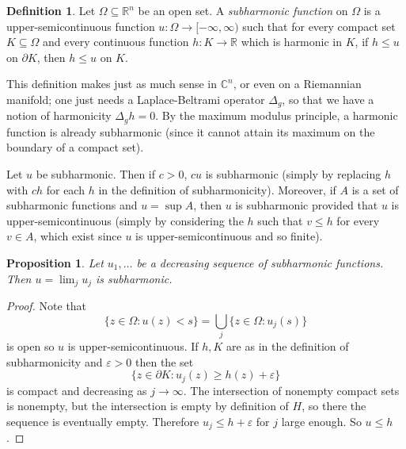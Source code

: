 \documentclass[12pt]{report}
\newcommand{\RR}{\mathbb{R}}
\newcommand{\CC}{\mathbb{C}}
\newcommand{\dfn}[1]{\emph{#1}\index{#1}}
\newtheorem{proposition}[theorem]{Proposition}
\theoremstyle{definition}
\newtheorem{definition}[theorem]{Definition}
\begin{document}
\begin{definition}
    Let $\Omega \subseteq \RR^n$ be an open set. A \dfn{subharmonic function} on $\Omega$ is a upper-semicontinuous function $u: \Omega \to [-\infty, \infty)$ such that for every compact set $K \subseteq \Omega$ and every continuous function $h: K \to \RR$ which is harmonic in $K$, if $h \leq u$ on $\partial K$, then $h \leq u$ on $K$.
\end{definition}
This definition makes just as much sense in $\CC^n$, or even on a Riemannian manifold; one just needs a Laplace-Beltrami operator $\Delta_g$, so that we have a notion of harmonicity $\Delta_g h = 0$. By the maximum modulus principle, a harmonic function is already subharmonic (since it cannot attain its maximum on the boundary of a compact set).

Let $u$ be subharmonic. Then if $c > 0$, $cu$ is subharmonic (simply by replacing $h$ with $ch$ for each $h$ in the definition of subharmonicity). Moreover, if $A$ is a set of subharmonic functions and $u = \sup A$, then $u$ is subharmonic provided that $u$ is upper-semicontinuous (simply by considering the $h$ such that $v \leq h$ for every $v \in A$, which exist since $u$ is upper-semicontinuous and so finite).

\begin{proposition}
Let $u_1, \dots$ be a decreasing sequence of subharmonic functions. Then $u = \lim_j u_j$ is subharmonic.
\end{proposition}
\begin{proof}
    Note that
    $$\{z \in \Omega: u(z) < s\} = \bigcup_j \{z \in \Omega: u_j(s)\}$$
    is open so $u$ is upper-semicontinuous. If $h, K$ are as in the definition of subharmonicity and $\varepsilon > 0$ then the set
    $$\{z \in \partial K: u_j(z) \geq h(z) + \varepsilon\}$$
    is compact and decreasing as $j \to \infty$. The intersection of nonempty compact sets is nonempty, but the intersection is empty by definition of $H$, so there the sequence is eventually empty. Therefore $u_j \leq h + \varepsilon$ for $j$ large enough. So $u \leq h$.
\end{proof}
\end{document}
